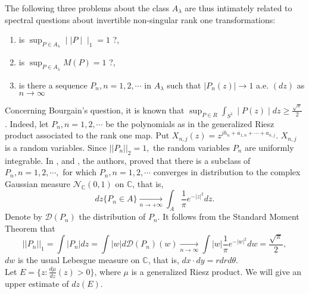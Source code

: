 \documentclass{amsart}
\theoremstyle{definition}
\theoremstyle{remark}
\numberwithin{equation}{section}
\newcommand{\tend}[3][]{\xrightarrow[#2\to#3]{#1}}
\newcommand{\1}{\mathbb{1}}
\begin{document}
The following three problems about the class $A_\lambda$ are thus intimately related to spectral questions about invertible non-singular rank one transformations: 
\begin{enumerate}[(1)]
\item is $\displaystyle \sup_{P\in A_\lambda}\mid\mid P\mid\mid_1 =1$ ?,
\item is  $\displaystyle \sup_{P\in A_\lambda} M(P) =1$ ?,
\item is there a sequence $P_n, n=1,2,\cdots $ in $A_\lambda$ such that $\mid P_n(z)\mid \rightarrow 1$ a.e. $(dz)$ as $n\rightarrow \infty$
\end{enumerate}    

Concerning Bourgain's question, it is known that $\sup_{P\in R}\int_{S^1}\mid P(z)\mid dz \geq \frac{\sqrt \pi}{2}$. Indeed, let  $P_n, n =1,2,\cdots$ be the polynomials as in the generalized Riesz product associated to the rank one map. Put
$X_{n,j}(z)=z^{j h_n+a_{1,n}+\cdots + a_{n,j}}$. $X_{n,j}$ is a random variables. Since
$||P_n||_2=1,$ the random variables $P_n$ are uniformly integrable. In \cite{elabdaletds}, \cite{AH1} and \cite{AH2}, the authors, proved that there is a subclass of $P_n, n =1,2,\cdots,$ for which $P_n, n =1,2,\cdots$ converges in distribution to the complex Gaussian measure
${\mathcal{N}}_{\mathbb {C}}(0,1)$ on ${\mathbb {C}}$, that is,
$$dz\{ P_n \in A\} \tend{n}{+\infty}\int_A \frac1{\pi}e^{-|z|^2} dz.$$
Denote by $\mathcal{D}(P_n)$ the distribution of $P_n$.
It follows from the Standard Moment Theorem \cite[pp.100]{Chung} that
\[
||P_n||_1 =\int |P_n| dz =\int |w| d\mathcal{D}(P_n)(w) \tend{n}{\infty} \int |w| \frac1{\pi}e^{-|w|^2} dw=\frac{\sqrt{\pi}}2,
\]
$dw$ is the usual Lebesgue measure on ${\mathbb {C}}$, that is, $dx\cdot dy=rdrd\theta$.\\


Let $E = \{z: \frac{d\mu}{dz}(z) > 0\}$, where $\mu$ is a generalized Riesz product.
We will give an upper estimate of $dz (E)$.
\end{document}
